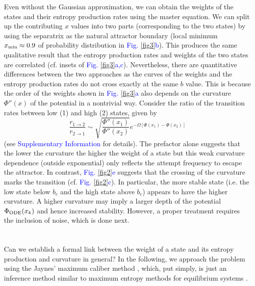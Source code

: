 \documentclass[aps,prl,reprint,singlecolumn,superscriptaddress]{revtex4}
\begin{document}
{Even without the Gaussian approximation, we can obtain the weights of the states and their entropy production rates
using the master equation. We can split up the contributing $x$ values into two parts (corresponding to the two states)
by using the separatrix as the natural attractor boundary (local minimum $x_{\rm min}\approx 0.9$ of probability distribution 
in \textcolor{blue}{Fig. \ref{fig3}b}). This produces the same qualitative result that the entropy production rates and weights of 
the two states are correlated (cf. insets of \textcolor{blue}{Fig. \ref{fig3}a,c}). Nevertheless, there are quantitative differences between 
the two approaches as the curves of the weights and the entropy production rates do not cross exactly at the same $b$ value.
This is because the order of the weights shown in \textcolor{blue}{Fig. \ref{fig3}a} also depends on the curvature $\Phi''(x)$ of the potential
in a nontrivial way. Consider the ratio of the transition rates between low (1) and high (2) states, given by \cite{vellela09,endres15}
\begin{equation}
\frac{r_{1\rightarrow 2}}{r_{2\rightarrow 1}}\sim \sqrt{\frac{\Phi''(x_1)}{\Phi''(x_2)}}e^{-\Omega[\Phi(x_1)-\Phi(x_2)]}\label{r_ratio}
\end{equation}
(see \textcolor{blue}{Supplementary Information} for details). The prefactor alone suggests that the lower the curvature the
higher the weight of a state but this weak curvature dependence (outside exponential) only reflects the attempt frequency 
to escape the attractor. In contrast,  \textcolor{blue}{Fig. \ref{fig2}e} suggests that the crossing of the curvature 
marks the transition (cf. \textcolor{blue}{Fig. \ref{fig2}c}). In particular, the more stable state (i.e. the low state below $b_c$
and the high state above $b_c$) appears to have the higher curvature. A higher curvature may imply a larger depth of the potential 
$\Phi_{\rm ODE}(x_k)$ and hence increased stability. However, a proper treatment requires the inclusion of noise, which is done
next.\\
\ \\
\newpage
{}\\
Can we establish a formal link between the weight of a state and its entropy production and curvature in general? 
In the following, we approach the problem using the {Jaynes'} maximum caliber method \cite{jaynes80,presse13}, 
{which, put simply, is just an inference method similar to maximum entropy methods for equilibrium systems \cite{dewar09}.}
}
\end{document}
